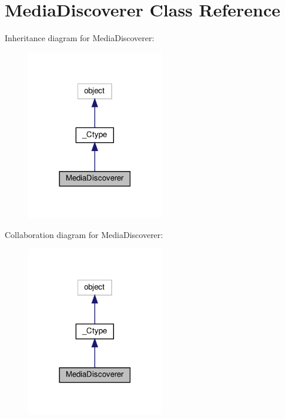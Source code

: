 \hypertarget{classvlc_1_1_media_discoverer}{}\section{Media\+Discoverer Class Reference}
\label{classvlc_1_1_media_discoverer}


Inheritance diagram for Media\+Discoverer\+:
\nopagebreak
\begin{figure}[H]
\begin{center}
\leavevmode
\includegraphics[width=170pt]{classvlc_1_1_media_discoverer__inherit__graph}
\end{center}
\end{figure}


Collaboration diagram for Media\+Discoverer\+:
\nopagebreak
\begin{figure}[H]
\begin{center}
\leavevmode
\includegraphics[width=170pt]{classvlc_1_1_media_discoverer__coll__graph}
\end{center}
\end{figure}
